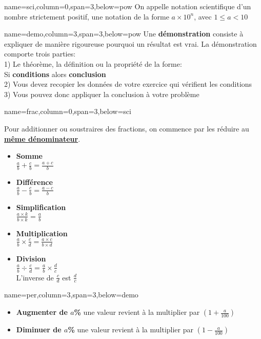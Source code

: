 \documentclass[a4paper,margin=1cm,fontscale=1]{baposter} %
\begin{document}
\begin{poster}
{name=sci,column=0,span=3,below=pow}
{
On appelle notation scientifique d'un nombre strictement positif, une notation de la forme $a\times 10^n$, avec $1 \leq a < 10$
}

{name=demo,column=3,span=3,below=pow}
{
Une \textbf{démonstration} consiste à expliquer de manière rigoureuse pourquoi un résultat est vrai. La démonstration comporte trois parties:
	\\1) Le théorème, la définition ou la propriété de la forme:
	\\Si \textbf{conditions} alors \textbf{conclusion}
	\\2) Vous devez recopier les données de votre exercice qui vérifient les conditions
	\\3) Vous pouvez donc appliquer la conclusion à votre problème
}

{name=frac,column=0,span=3,below=sci}
{
Pour additionner ou soustraires des fractions, on commence par les réduire au \textbf{\underline{même dénominateur}}.
\begin{itemize}
	\item \textbf {Somme}
	\\ $\frac{a}{b} + \frac{c}{b} = \frac{a+c}{b}$
	\item \textbf {Différence}
	\\ $\frac{a}{b} - \frac{c}{b} = \frac{a-c}{b}$
	\item \textbf {Simplification}
	\\ $\frac{a\times k}{b\times k} = \frac{a}{b}$
	\item \textbf {Multiplication}
	\\ $\frac{a}{b} \times  \frac{c}{d} = \frac{a\times c}{b\times d}$
	
	\item \textbf {Division}
	\\ $\frac{a}{b} \div \frac{c}{d} = \frac{a}{b} \times \frac{d}{c}$
	\\ L'inverse de $\frac{c}{d}$ est $\frac{d}{c}$
\end{itemize}
}

{name=per,column=3,span=3,below=demo}
{
\begin{itemize}
	\item \textbf{Augmenter de $a$\%} une valeur revient à la multiplier par $(1 + \frac{a}{100})$
	\item \textbf{Diminuer de $a$\%} une valeur revient à la multiplier par $(1 - \frac{a}{100})$
\end{itemize}
}


\end{poster}
\end{document}
